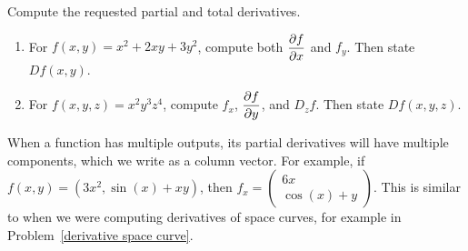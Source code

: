 \begin{problem}%
Compute the requested partial and total derivatives.
\begin{enumerate}
 \item  For $f(x,y)=x^2+2xy+3y^2$, compute both $\displaystyle\frac{\partial f}{\partial x}$ and $f_y$. Then state $Df(x,y)$. 
 \item  For $f(x,y,z)=x^2y^3z^4$, compute $f_x$, $\displaystyle\frac{\partial f}{\partial y}$, and $D_z f$. Then state $Df(x,y,z)$.
\end{enumerate}
\end{problem}

When a function has multiple outputs, its partial derivatives will have multiple components, which we write as a column vector.  For example, if $f(x,y)=(3x^2, \sin(x)+xy)$, then $f_x=\left(\begin{matrix}6x\\\cos(x)+y\end{matrix}\right)$.  This is similar to when we were computing derivatives of space curves, for example in Problem~\ref{derivative space curve}.

